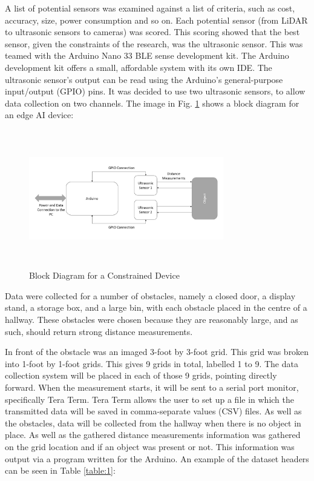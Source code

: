 \documentclass[conference]{IEEEtran}
\begin{document}
A list of potential sensors was examined against a list of criteria, such as cost, accuracy, size, power consumption and so on. Each potential sensor (from LiDAR to ultrasonic sensors to cameras) was scored. This scoring showed that the best sensor, given the constraints of the research, was the ultrasonic sensor. This was teamed with the Arduino Nano 33 BLE sense development kit. The Arduino development kit offers a small, affordable system with its own IDE. The ultrasonic sensor's output can be read using the Arduino's general-purpose input/output (GPIO) pins. It was decided to use two ultrasonic sensors, to allow data collection on two channels. The image in Fig. \ref{fig:collection1} shows a block diagram for an edge AI device:    
\begin{figure}[ht]
\includegraphics[width=8.5cm, height=6cm]{images/data_collection_block.png}
\centering
\caption{Block Diagram for a Constrained Device}
\label{fig:collection1}
\end{figure}

Data were collected for a number of obstacles, namely a closed door, a display stand, a storage box, and a large bin, with each obstacle placed in the centre of a hallway. These obstacles were chosen because they are reasonably large, and as such, should return strong distance measurements. 

In front of the obstacle was an imaged 3-foot by 3-foot grid. This grid was broken into 1-foot by 1-foot grids. This gives 9 grids in total, labelled 1 to 9. The data collection system will be placed in each of those 9 grids, pointing directly forward. When the measurement starts, it will be sent to a serial port monitor, specifically Tera Term. Tera Term allows the user to set up a file in which the transmitted data will be saved in comma-separate values (CSV) files. As well as the obstacles, data will be collected from the hallway when there is no object in place. As well as the gathered distance measurements information was gathered on the grid location and if an object was present or not. This information was output via a program written for the Arduino. An example of the dataset headers can be seen in Table \ref{table:1}:
\end{document}
